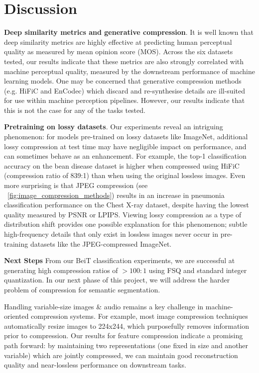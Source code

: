 \documentclass[10pt,twocolumn,letterpaper]{article}
\begin{document}
\section{Discussion}

\textbf{Deep similarity metrics and generative compression}. It is well known that deep similarity metrics are highly effective at predicting human perceptual quality as measured by mean opinion score (MOS). Across the six datasets tested, our results indicate that these metrics are also strongly correlated with machine perceptual quality, measured by the downstream performance of machine learning models. One may be concerned that generative compression methods (e.g. HiFiC and EnCodec) which discard and re-synthesise details are ill-suited for use within machine perception pipelines. However, our results indicate that this is not the case for any of the tasks tested.

\textbf{Pretraining on lossy datasets}. Our experiments reveal an intriguing phenomenon: for models pre-trained on lossy datasets like ImageNet, additional lossy compression at test time may have negligible impact on performance, and can sometimes behave as an enhancement. For example, the top-1 classification accuracy on the bean disease dataset is higher when compressed using HiFiC (compression ratio of 839:1) than when using the original lossless images. Even more surprising is that JPEG compression (see ~\ref{fig:image_compression_methods}) results in an increase in pneumonia classification performance on the Chest X-ray dataset, despite having the lowest quality measured by PSNR or LPIPS. Viewing lossy compression as a type of distribution shift provides one possible explanation for this phenomenon; subtle high-frequency details that only exist in lossless images never occur in pre-training datasets like the JPEG-compressed ImageNet.

\textbf{Next Steps}
From our BeiT classification experiments, we are successful at generating high compression ratios of $> 100:1$ using FSQ and standard integer quantization. In our next phase of this project, we will address the harder problem of compression for semantic segmentation.

Handling variable-size images \& audio remains a key challenge in machine-oriented compression systems. For example, most image compression techniques automatically resize images to 224x244, which purposefully removes information prior to compression. Our results for feature compression indicate a promising path forward: by maintaining two representations (one fixed in size and another variable) which are jointly compressed, we can maintain good reconstruction quality and near-lossless performance on downstream tasks.

{\small


}
\end{document}
